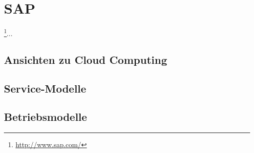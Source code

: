\section{SAP}
\label{sec_sap}

\footnote{\url{http://www.sap.com/}}...

\subsection{Ansichten zu Cloud Computing}
\label{sec_sap_general}



\subsection{Service-Modelle}
\label{sec_sap_delivery}



\subsection{Betriebsmodelle}
\label{sec_sap_deployment}

